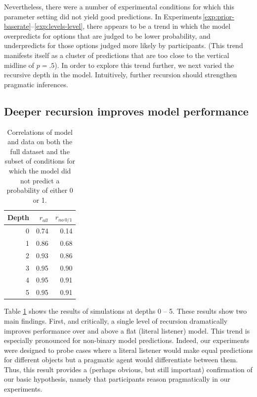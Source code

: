 \documentclass[man,noapacite]{apa2}
\newcounter{Experiment}
\newcommand{\exptrefrange}[2]{Experiments\,\ref{#1}--\ref{#2}}
\begin{document}
Nevertheless, there were a number of experimental conditions for which this parameter setting did not yield good predictions. In \exptrefrange{exp:prior-baserate}{exp:levels-level}, there appears to be a trend in which the model overpredicts for options that are judged to be lower probability, and underpredicts for those options judged more likely by participants. (This trend manifests itself as a cluster of predictions that are too close to the vertical midline of $p=.5$). In order to explore this trend further, we next varied the recursive depth in the model. Intuitively, further recursion should strengthen pragmatic inferences.

\subsection{Deeper recursion improves model performance}

\begin{table}[ht]
\centering
\begin{tabular}{rrr}
  \hline
Depth & $r_{all}$ & $r_{no~0/1}$ \\
  \hline
  0 & 0.74 & 0.14 \\
    1 & 0.86 & 0.68 \\
    2 & 0.93 & 0.86 \\
    3 & 0.95 & 0.90 \\
    4 & 0.95 & 0.91 \\
    5 & 0.95 & 0.91 \\
   \hline
\end{tabular}
\caption{\label{tab:corr-a1} Correlations of model and data on both the full dataset and the subset of conditions for which the model did not predict a probability of either 0 or 1.}
\end{table}

Table \ref{tab:corr-a1} shows the results of simulations at depths 0 -- 5. These results show two main findings. First, and critically, a single level of recursion dramatically improves performance over and above a flat (literal listener) model. This trend is especially pronounced for non-binary model predictions. Indeed, our experiments were designed to probe cases where a literal listener would make equal predictions for different objects but a pragmatic agent would differentiate between them. Thus, this result provides a (perhaps obvious, but still important) confirmation of our basic hypothesis, namely that participants reason pragmatically in our experiments.
\end{document}
